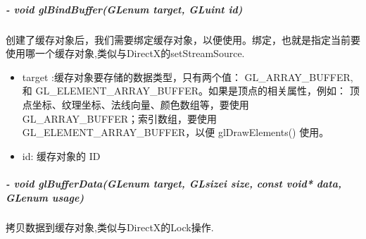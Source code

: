 \documentclass[UTF8,a4paper,12pt]{ctexbook}
\begin{document}
			\subparagraph{- void glBindBuffer(GLenum target, GLuint id)}创建了缓存对象后，我们需要绑定缓存对象，以便使用。绑定，也就是指定当前要使用哪一个缓存对象,类似与DirectX的setStreamSource.
				\begin{itemize}
					\item target :缓存对象要存储的数据类型，只有两个值： GL\_ARRAY\_BUFFER, 和 GL\_ELEMENT\_ARRAY\_BUFFER。如果是顶点的相关属性，例如： 顶点坐标、纹理坐标、法线向量、颜色数组等，要使用 GL\_ARRAY\_BUFFER；索引数组，要使用 GL\_ELEMENT\_ARRAY\_BUFFER，以便 glDrawElements() 使用。
					
					\item id: 缓存对象的 ID
				\end{itemize}
			
			\subparagraph{- void glBufferData(GLenum target, GLsizei size, const void* data, GLenum usage)}拷贝数据到缓存对象,类似与DirectX的Lock操作.
\end{document}
